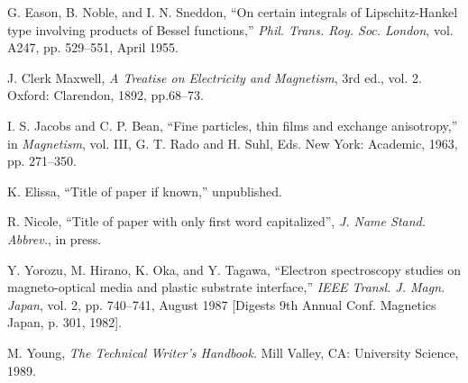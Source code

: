 \begin{thebibliography}{10}

 G. Eason, B. Noble, and I. N. Sneddon, ``On certain integrals of
Lipschitz-Hankel type involving products of Bessel functions,'' {\em Phil.
Trans. Roy. Soc. London}, vol. A247, pp. 529--551, April 1955.

 J. Clerk Maxwell, {\em A Treatise on Electricity and Magnetism}, 3rd ed.,
vol. 2. Oxford: Clarendon, 1892, pp.68--73.

 I. S. Jacobs and C. P. Bean, ``Fine particles, thin films and exchange
anisotropy,'' in {\em Magnetism}, vol. III, G. T. Rado and H. Suhl, Eds.
New York: Academic, 1963, pp. 271--350.

 K. Elissa, ``Title of paper if known,'' unpublished.

 R. Nicole, ``Title of paper with only first word capitalized'',
{\em J. Name Stand. Abbrev.}, in press.

 Y. Yorozu, M. Hirano, K. Oka, and Y. Tagawa, ``Electron spectroscopy
studies on magneto-optical media and plastic substrate interface,'' {\em
IEEE Transl. J. Magn. Japan}, vol. 2, pp. 740--741, August 1987 [Digests
9th Annual Conf. Magnetics Japan, p. 301, 1982].

 M. Young, {\em The Technical Writer's Handbook}. Mill Valley, CA: University
Science, 1989.


\end{thebibliography}



